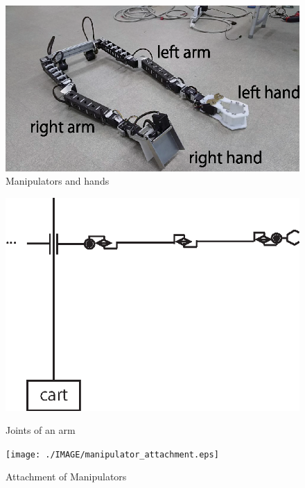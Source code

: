 \documentclass{llncs}
\begin{document}
\begin{figure}[h]
	\begin{center}
		\includegraphics[width=0.7\linewidth]{./IMAGE/manipulators.eps}
		\caption{Manipulators and hands}
		\label{fig:manipulators}
	\end{center}
\end{figure}

\begin{figure}[h]
\begin{minipage}{23em}
	\begin{center}
		\includegraphics[width=0.95\linewidth]{./IMAGE/joints.eps}
		\caption{Joints of an arm}
		\label{fig:joints}
	\end{center}
\end{minipage}
\begin{minipage}{15em}
	\begin{center}
		\texttt{[image: ./IMAGE/manipulator\_attachment.eps]}
		\caption{Attachment of Manipulators}
		\label{fig:manipulator_attachment}
\end{center}
\end{minipage}
\end{figure}
\end{document}
